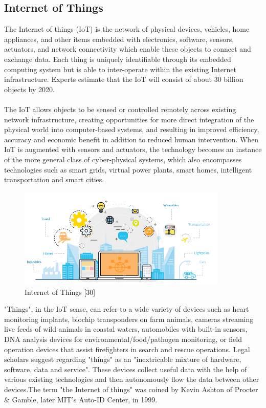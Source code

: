 \documentclass[twoside,a4paper,16pt]{book}
\begin{document}
{{\subsection{Internet of Things}
The Internet of things (IoT) is the network of physical devices, vehicles, home appliances, and other items embedded with electronics, software, sensors, actuators, and network connectivity which enable these objects to connect and exchange data. Each thing is uniquely identifiable through its embedded computing system but is able to inter-operate within the existing Internet infrastructure. Experts estimate that the IoT will consist of about 30 billion objects by 2020.\\\\
The IoT allows objects to be sensed or controlled remotely across existing network infrastructure, creating opportunities for more direct integration of the physical world into computer-based systems, and resulting in improved efficiency, accuracy and economic benefit in addition to reduced human intervention. When IoT is augmented with sensors and actuators, the technology becomes an instance of the more general class of cyber-physical systems, which also encompasses technologies such as smart grids, virtual power plants, smart homes, intelligent transportation and smart cities.
 \begin{figure}[ht!]
 	\begin{center}
 		\includegraphics[width=10.0cm]{5.jpg}
 		\caption{Internet of Things [30]}
 	\end{center}
 \end{figure}
"Things", in the IoT sense, can refer to a wide variety of devices such as heart monitoring implants, biochip transponders on farm animals, cameras streaming live feeds of wild animals in coastal waters, automobiles with built-in sensors, DNA analysis devices for environmental/food/pathogen monitoring, or field operation devices that assist firefighters in search and rescue operations. Legal scholars suggest regarding "things" as an "inextricable mixture of hardware, software, data and service".
These devices collect useful data with the help of various existing technologies and then autonomously flow the data between other devices.The term "the Internet of things" was coined by Kevin Ashton of Procter \& Gamble, later MIT's Auto-ID Center, in 1999.
}}
\end{document}
